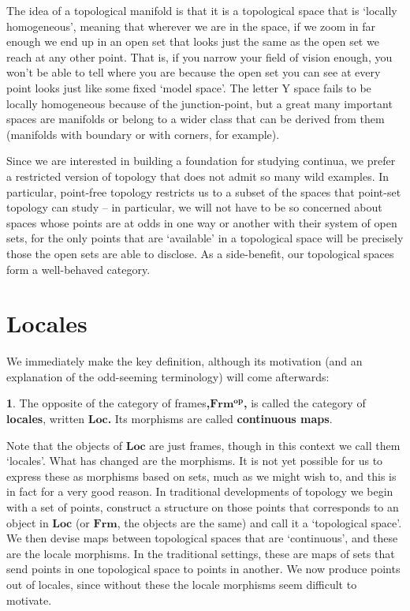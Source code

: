 \documentclass[oneside,english]{amsbook}
\numberwithin{section}{chapter}
\theoremstyle{plain}
\theoremstyle{definition}
\newtheorem{defn}[thm]{\protect\definitionname}
\providecommand{\definitionname}{Definition}
\begin{document}
The idea of a topological manifold is that it is a topological space that is `locally homogeneous', meaning that wherever we are in the space, if we zoom in far enough we end up in an open set that looks just the same as the open set we reach at any other point. That is, if you narrow your field of vision enough, you won't be able to tell where you are because the open set you can see at every point looks just like some fixed `model space'. The letter Y space fails to be locally homogeneous because of the junction-point, but a great many important spaces are manifolds or belong to a wider class that can be derived from them (manifolds with boundary or with corners, for example).

Since we are interested in building a foundation for studying continua, we prefer a restricted version of topology that does not admit so many wild examples. In particular, point-free topology restricts us to a subset of the spaces that point-set topology can study -- in particular, we will not have to be so concerned about spaces whose points are at odds in one way or another with their system of open sets, for the only points that are `available' in a topological space will be precisely those the open sets are able to disclose. As a side-benefit, our topological spaces form a well-behaved category.


\section{Locales}

We immediately make the key definition, although its motivation (and an explanation of the odd-seeming terminology) will come afterwards: 

\begin{defn} 
	The opposite of the category of frames\textbf{,$\mathbf{Frm^{op}}$,} is called the category of \textbf{locales}, written \textbf{$\mathbf{Loc}$. }Its morphisms are called \textbf{continuous maps}. 
\end{defn} 

Note that the objects of \textbf{$\mathbf{Loc}$ }are just frames, though in this context we call them `locales'. What has changed are the morphisms. It is not yet possible for us to express these as morphisms based on sets, much as we might wish to, and this is in fact for a very good reason. In traditional developments of topology we begin with a set of points, construct a structure on those points that corresponds to an object in \textbf{$\mathbf{Loc}$} (or\textbf{ $\mathbf{Frm}$}, the objects are the same) and call it a `topological space'. We then devise maps between topological spaces that are `continuous', and these are the locale morphisms. In the traditional settings, these are maps of sets that send points in one topological space to points in another. We now produce points out of locales, since without these the locale morphisms seem difficult to motivate. 
\end{document}
